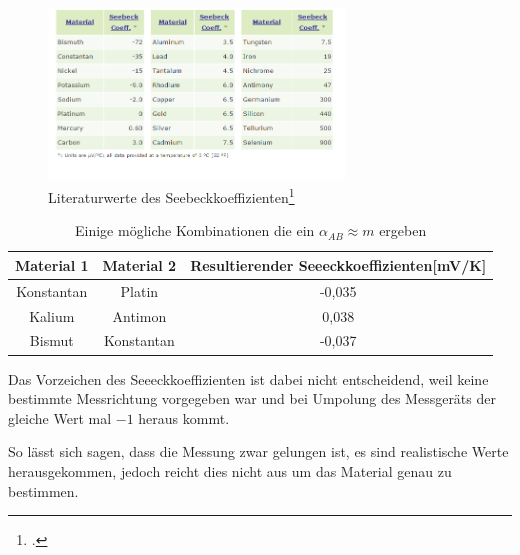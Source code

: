 \begin{figure}[htbp] 
  \centering
	\includegraphics[width=0.7\textwidth]{Seebeckkof.png}
	\caption{Literaturwerte des Seebeckkoeffizienten\footcite{Seebecklit}}
  \label{fig:Seebecklit}
\end{figure}
\begin{table}[H]
  \centering
  \begin{tabular}{c | c | c}
    Material 1 & Material 2 & Resultierender Seeeckkoeffizienten[mV/K]\\ \hline
    Konstantan  & Platin & -0,035\\
    Kalium & Antimon & 0,038\\
    Bismut & Konstantan & -0,037
  \end{tabular}
  \caption{Einige mögliche Kombinationen die ein $\alpha_{AB}\approx m$ ergeben}
  \label{tab:thermobeispiele}
\end{table}
Das Vorzeichen des Seeeckkoeffizienten ist dabei nicht entscheidend, weil keine bestimmte Messrichtung vorgegeben war und bei Umpolung des Messgeräts der gleiche Wert mal $-1$ heraus kommt.

So lässt sich sagen, dass die Messung zwar gelungen ist, es sind realistische Werte herausgekommen, jedoch reicht dies nicht aus um das Material genau zu bestimmen.